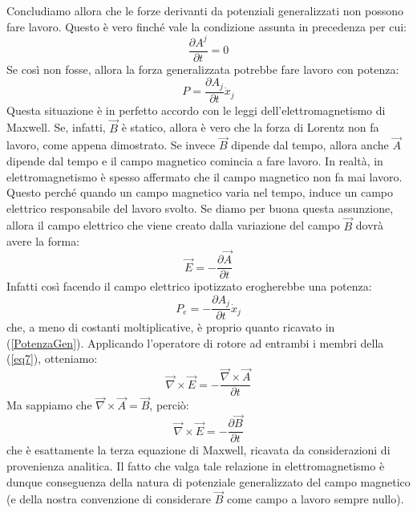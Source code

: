 \documentclass[a4paper,openany]{article}
\begin{document}
	Concludiamo allora che le forze derivanti da potenziali generalizzati non possono fare lavoro. Questo è vero finché vale la condizione assunta in precedenza per cui:
	$$
	\dfrac{\partial A^j}{\partial t} = 0
	$$
	Se così non fosse, allora la forza generalizzata potrebbe fare lavoro con potenza:
	\begin{equation}
		P = \dfrac{\partial A_j}{\partial t}\dot{x}_j
		\label{PotenzaGen}
	\end{equation}
	Questa situazione è in perfetto accordo con le leggi dell'elettromagnetismo di Maxwell. Se, infatti, $\vec{B}$ è statico, allora è vero che la forza di Lorentz non fa lavoro, come appena dimostrato. Se invece $\vec{B}$ dipende dal tempo, allora anche $\vec{A}$ dipende dal tempo e il campo magnetico comincia a fare lavoro. In realtà, in elettromagnetismo è spesso affermato che il campo magnetico non fa mai lavoro. Questo perché quando un campo magnetico varia nel tempo, induce un campo elettrico responsabile del lavoro svolto. Se diamo per buona questa assunzione, allora il campo elettrico che viene creato dalla variazione del campo $\vec{B}$ dovrà avere la forma:
	\begin{equation}
		\vec{E} = -\dfrac{\partial \vec{A}}{\partial t}
		\label{eq7}
	\end{equation}
	Infatti così facendo il campo elettrico ipotizzato erogherebbe una potenza:
	$$
	P_e = -\dfrac{\partial A_j}{\partial t}\dot{x}_j
	$$
	che, a meno di costanti moltiplicative, è proprio quanto ricavato in (\ref{PotenzaGen}). Applicando l'operatore di rotore ad entrambi i membri della (\ref{eq7}), otteniamo:
	$$
	\vec{\nabla}\times \vec{E} = - \dfrac{\vec{\nabla}\times\vec{A}}{\partial t}
	$$
	Ma sappiamo che $\vec{\nabla}\times\vec{A} = \vec{B}$, perciò:
	\begin{equation}
		\vec{\nabla}\times \vec{E} = - \dfrac{\partial \vec{B}}{\partial t}
		\label{Maxwell3}
	\end{equation}
	che è esattamente la terza equazione di Maxwell, ricavata da considerazioni di provenienza analitica. Il fatto che valga tale relazione in elettromagnetismo è dunque conseguenza della natura di potenziale generalizzato del campo magnetico (e della nostra convenzione di considerare $\vec{B}$ come campo a lavoro sempre nullo).
	
\end{document}
